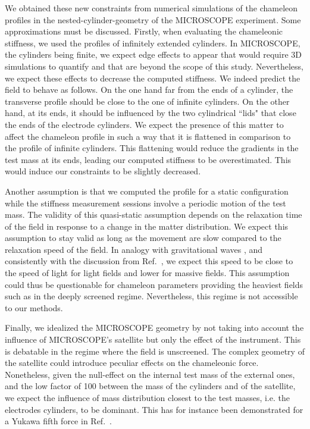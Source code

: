 \documentclass[aps,prd,twocolumn,superscriptaddress,nofootinbib,eqsecnumm,showpacs]{revtex4-1}
\renewcommand\({\left(}
\renewcommand\){\right)}
\renewcommand\[{\left[}
\renewcommand\]{\right]}
\begin{document}
We obtained these new constraints from numerical simulations of the chameleon profiles in the nested-cylinder-geometry of the MICROSCOPE experiment. Some approximations must be discussed. Firstly, when evaluating the chameleonic stiffness, we used the profiles of infinitely extended cylinders. In MICROSCOPE, the cylinders being finite, we expect edge effects to appear that would require 3D simulations to quantify and that are beyond the scope of this study. Nevertheless, we expect these effects to decrease the computed stiffness. We indeed predict the field to behave as follows. On the one hand far from the ends of a cylinder, the transverse profile should be close to the one of infinite cylinders. On the other hand, at its ends, it should be influenced by the two cylindrical ``lids" that close the ends of the electrode cylinders. We expect the presence of this matter to affect the chameleon profile in such a way that it is flattened in comparison to the profile of infinite cylinders. This flattening would reduce the gradients in the test mass at its ends, leading our computed stiffness to be overestimated. This would induce our constraints to be slightly decreased.

Another assumption is that we computed the profile for a static configuration while the stiffness measurement sessions involve a periodic motion of the test mass. The validity of this quasi-static assumption depends on the relaxation time of the field in response to a change in the matter distribution. We expect this assumption to stay valid as long as the movement are slow compared to the relaxation speed of the field. In analogy with gravitational waves \cite{PhysRevD.57.2061}, and consistently with the discussion from Ref.~\cite{burrage_probing_2015}, we expect this speed to be close to the speed of light for light fields and lower for massive fields. This assumption could thus be questionable for chameleon parameters providing the heaviest fields such as in the deeply screened regime. Nevertheless, this regime is not accessible to our methods.

Finally, we idealized the MICROSCOPE geometry by not taking into account the influence of MICROSCOPE's satellite but only the effect of the instrument. This is debatable in the regime where the field is unscreened. The complex geometry of the satellite could introduce peculiar effects on the chameleonic force. Nonetheless, given the null-effect on the internal test mass of the external ones, and the low factor of 100 between the mass of the cylinders and of the satellite, we expect the influence of mass distribution closest to the test masses, i.e. the electrodes cylinders, to be dominant. This has for instance been demonstrated for a Yukawa fifth force in Ref.~\cite{CQG2}.
\end{document}
